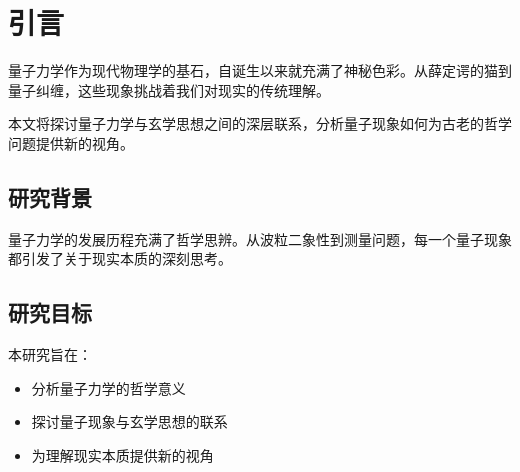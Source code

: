 \section{引言}

量子力学作为现代物理学的基石，自诞生以来就充满了神秘色彩。从薛定谔的猫到量子纠缠，这些现象挑战着我们对现实的传统理解。

本文将探讨量子力学与玄学思想之间的深层联系，分析量子现象如何为古老的哲学问题提供新的视角。

\subsection{研究背景}

量子力学的发展历程充满了哲学思辨。从波粒二象性到测量问题，每一个量子现象都引发了关于现实本质的深刻思考。

\subsection{研究目标}

本研究旨在：
\begin{itemize}
\item 分析量子力学的哲学意义
\item 探讨量子现象与玄学思想的联系
\item 为理解现实本质提供新的视角
\end{itemize} 